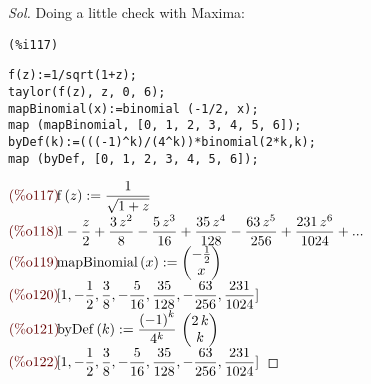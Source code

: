 \begin{proof}[Sol]
  Doing a little check with Maxima:\\  
\noindent
\begin{minipage}[t]{8ex}{\color{red}\bf
\begin{verbatim}
(%i117) 
\end{verbatim}}
\end{minipage}
\begin{minipage}[t]{\textwidth}{\color{blue}
\begin{verbatim}
f(z):=1/sqrt(1+z);
taylor(f(z), z, 0, 6);
mapBinomial(x):=binomial (-1/2, x);
map (mapBinomial, [0, 1, 2, 3, 4, 5, 6]);
byDef(k):=(((-1)^k)/(4^k))*binomial(2*k,k);
map (byDef, [0, 1, 2, 3, 4, 5, 6]);
\end{verbatim}}
\end{minipage}
\begin{math}\displaystyle
\parbox{8ex}{\color{labelcolor}(\%o117) }
\mathrm{f}\left( z\right) :=\frac{1}{\sqrt{1+z}}
\end{math}\\
\begin{math}\displaystyle
\parbox{8ex}{\color{labelcolor}(\%o118) }
1-\frac{z}{2}+\frac{3\,{z}^{2}}{8}-\frac{5\,{z}^{3}}{16}+\frac{35\,{z}^{4}}{128}-\frac{63\,{z}^{5}}{256}+\frac{231\,{z}^{6}}{1024}+...
\end{math}\\
\begin{math}\displaystyle
\parbox{8ex}{\color{labelcolor}(\%o119) }
\mathrm{mapBinomial}\left( x\right) :=\begin{pmatrix}-\frac{1}{2}\cr x\end{pmatrix}
\end{math}\\
\begin{math}\displaystyle
\parbox{8ex}{\color{labelcolor}(\%o120) }
[1,-\frac{1}{2},\frac{3}{8},-\frac{5}{16},\frac{35}{128},-\frac{63}{256},\frac{231}{1024}]
\end{math}\\
\begin{math}\displaystyle
\parbox{8ex}{\color{labelcolor}(\%o121) }
\mathrm{byDef}\left( k\right) :=\frac{{\left( -1\right) }^{k}}{{4}^{k}}\,\begin{pmatrix}2\,k\cr k\end{pmatrix}
\end{math}\\
\begin{math}\displaystyle
\parbox{8ex}{\color{labelcolor}(\%o122) }
[1,-\frac{1}{2},\frac{3}{8},-\frac{5}{16},\frac{35}{128},-\frac{63}{256},\frac{231}{1024}]
\end{math}

\end{proof}